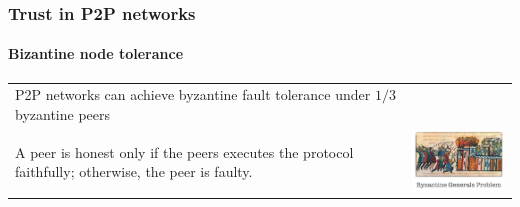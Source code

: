 \begin{frame}
\frametitle{Trust in P2P networks}
\framesubtitle{Bizantine node tolerance}
\begin{table}
\begin{tabular}{p{7cm}p{3cm}}
  P2P networks can achieve byzantine fault tolerance under $1/3$ byzantine
  peers\\
  A peer is honest only if the peers executes the protocol faithfully;
  otherwise, the peer is faulty.
&
\vspace{1.5cm}
\includegraphics[width=4cm]{img/bizantine_generals_problem}\\
\end{tabular}
\end{table}
\end{frame}

